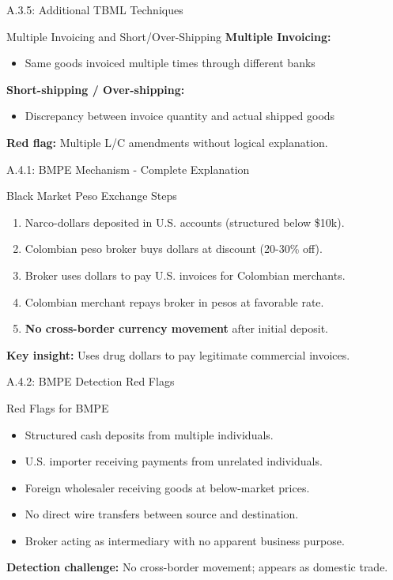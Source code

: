 \documentclass{beamer}
\begin{document}
	\begin{frame}{A.3.5: Additional TBML Techniques}
		\begin{block}{Multiple Invoicing and Short/Over-Shipping}
			\textbf{Multiple Invoicing:}
			\begin{itemize}
				\item Same goods invoiced multiple times through different banks
			\end{itemize}
			\textbf{Short-shipping / Over-shipping:}
			\begin{itemize}
				\item Discrepancy between invoice quantity and actual shipped goods
			\end{itemize}
			\textbf{Red flag:} Multiple L/C amendments without logical explanation.
		\end{block}
	\end{frame}
	
	
	\begin{frame}{A.4.1: BMPE Mechanism - Complete Explanation}
		\begin{block}{Black Market Peso Exchange Steps}
			\begin{enumerate}
				\item Narco-dollars deposited in U.S. accounts (structured below \$10k).
				\item Colombian peso broker buys dollars at discount (20-30\% off).
				\item Broker uses dollars to pay U.S. invoices for Colombian merchants.
				\item Colombian merchant repays broker in pesos at favorable rate.
				\item \textbf{No cross-border currency movement} after initial deposit.
			\end{enumerate}
		\end{block}
		\textbf{Key insight:} Uses drug dollars to pay legitimate commercial invoices.
	\end{frame}
	
	\begin{frame}{A.4.2: BMPE Detection Red Flags}
		\begin{block}{Red Flags for BMPE}
			\begin{itemize}
				\item Structured cash deposits from multiple individuals.
				\item U.S. importer receiving payments from unrelated individuals.
				\item Foreign wholesaler receiving goods at below-market prices.
				\item No direct wire transfers between source and destination.
				\item Broker acting as intermediary with no apparent business purpose.
			\end{itemize}
		\end{block}
		\textbf{Detection challenge:} No cross-border movement; appears as domestic trade.
	\end{frame}
	
\end{document}
